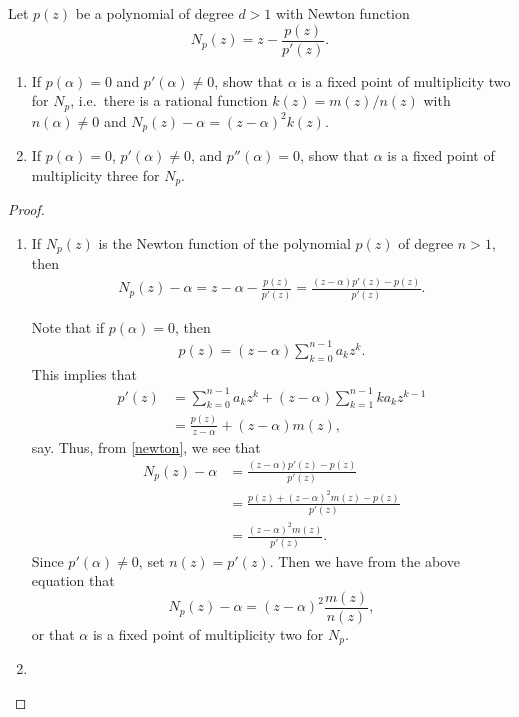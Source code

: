 \begin{problem}{5}
  Let $p(z)$ be a polynomial of degree $d > 1$ with Newton function
  $$\displaystyle N_p(z) = z - \frac{p(z)}{p'(z)}.$$
  \begin{enumerate}
    \item If $p(\alpha) = 0$ and $p'(\alpha) \neq 0$, show that $\alpha$ is a fixed point
      of multiplicity two for $N_p$, i.e.\ there is a rational function $k(z) = m(z) / n(z)$ with
      $n(\alpha) \neq 0$ and $N_p(z) - \alpha = (z-\alpha)^2 k(z)$.
    \item If $p(\alpha) = 0$, $p'(\alpha) \neq 0$, and $p''(\alpha) = 0$, show that $\alpha$
      is a fixed point of multiplicity three for $N_p$.
  \end{enumerate}
\end{problem}

\begin{proof}
  \begin{enumerate}
    \item If $N_p(z)$ is the Newton function of the polynomial $p(z)$ of degree $n > 1$, then
      \begin{align}\label{newton}
        N_p(z) - \alpha = z - \alpha - \frac{p(z)}{p'(z)} = \frac{(z-\alpha)p'(z) - p(z)}{p'(z)}.
      \end{align}

      Note that if $p(\alpha) = 0$, then
      \begin{align*}
        p(z) = (z-\alpha)\sum_{k=0}^{n-1}a_k z^k.
      \end{align*}
      This implies that
      \begin{align*}
        p'(z) &= \sum_{k=0}^{n-1}a_k z^k + (z-\alpha)\sum_{k=1}^{n-1}k a_k z^{k-1} \\
        &= \frac{p(z)}{z-\alpha} + (z-\alpha)m(z),
      \end{align*}
      say. Thus, from \eqref{newton}, we see that
      \begin{align*}
        N_p(z) - \alpha &= \frac{(z-\alpha)p'(z) - p(z)}{p'(z)} \\
        &= \frac{p(z) + (z-\alpha)^2m(z) - p(z)}{p'(z)} \\
        &= \frac{(z-\alpha)^2m(z)}{p'(z)}.
      \end{align*}
      Since $p'(\alpha) \neq 0$, set $n(z) = p'(z)$. Then we have from the above
      equation that
      $$N_p(z) - \alpha = (z-\alpha)^2 \frac{m(z)}{n(z)},$$ or that $\alpha$
      is a fixed point of multiplicity two for $N_p$.
    \item
  \end{enumerate}
\end{proof}
\newpage
